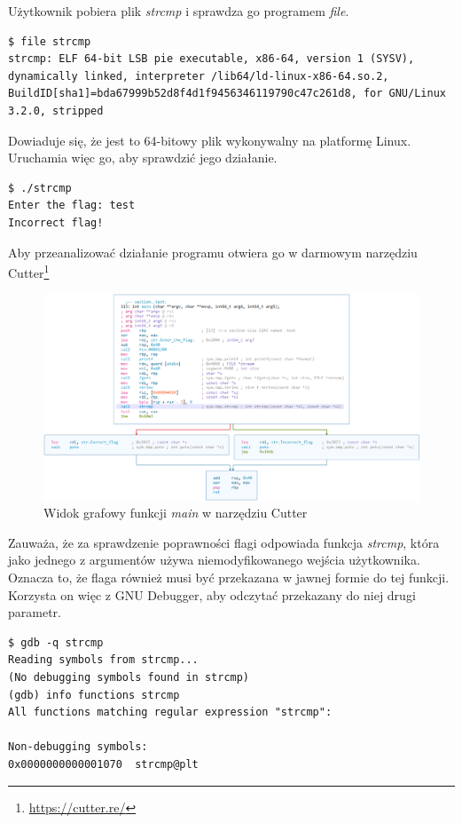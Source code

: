 \documentclass[language=polish,type=eng]{aghmodern}
\begin{document}
Użytkownik pobiera plik \emph{strcmp} i sprawdza go programem \emph{file}.

\begin{verbatim}
$ file strcmp
strcmp: ELF 64-bit LSB pie executable, x86-64, version 1 (SYSV), dynamically linked, interpreter /lib64/ld-linux-x86-64.so.2, BuildID[sha1]=bda67999b52d8f4d1f9456346119790c47c261d8, for GNU/Linux 3.2.0, stripped
\end{verbatim}

Dowiaduje się, że jest to 64-bitowy plik wykonywalny na platformę Linux.
Uruchamia więc go, aby sprawdzić jego działanie.

\begin{verbatim}
$ ./strcmp
Enter the flag: test
Incorrect flag!
\end{verbatim}

Aby przeanalizować działanie programu otwiera go w darmowym narzędziu Cutter\footnote{\url{https://cutter.re/}}

\begin{figure}[H]
\centering
\includegraphics[width=\textwidth]{300_cutter}
\caption{Widok grafowy funkcji \emph{main} w narzędziu Cutter}
\end{figure}

Zauważa, że za sprawdzenie poprawności flagi odpowiada funkcja \emph{strcmp}, która
jako jednego z argumentów używa niemodyfikowanego wejścia użytkownika.
Oznacza to, że flaga również musi być przekazana w jawnej formie do tej funkcji.
Korzysta on więc z GNU Debugger, aby odczytać przekazany do niej drugi parametr.

\begin{verbatim}
$ gdb -q strcmp
Reading symbols from strcmp...
(No debugging symbols found in strcmp)
(gdb) info functions strcmp
All functions matching regular expression "strcmp":

Non-debugging symbols:
0x0000000000001070  strcmp@plt
\end{verbatim}
\end{document}
